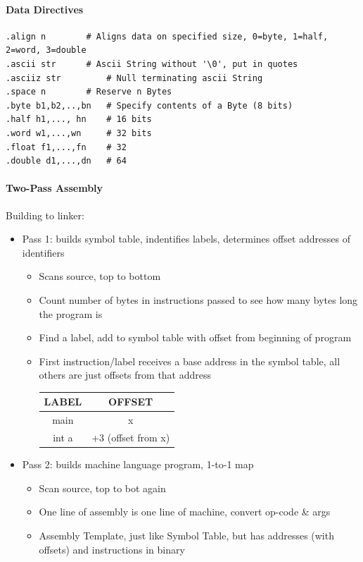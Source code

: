 \documentclass[12 pt]{article}
\begin{document}
\paragraph{Data Directives}
\begin{lstlisting}
.align n		# Aligns data on specified size, 0=byte, 1=half, 2=word, 3=double
.ascii str 	  	# Ascii String without '\0', put in quotes
.asciiz str 	  	# Null terminating ascii String
.space n	  	# Reserve n Bytes
.byte b1,b2,..,bn	# Specify contents of a Byte (8 bits)
.half h1,..., hn  	# 16 bits
.word w1,...,wn		# 32 bits
.float f1,...,fn	# 32
.double d1,...,dn	# 64
\end{lstlisting}
\paragraph{Two-Pass Assembly}
Building to linker:
\begin{itemize}
\item Pass 1: builds symbol table, indentifies labels, determines offset addresses of identifiers
\begin{itemize}
\item Scans source, top to bottom
\item Count number of bytes in instructions passed to see how many bytes long the program is
\item Find a label, add to symbol table with offset from beginning of program
\item First instruction/label receives a base address in the symbol table, all others are just offsets from that address
\\
\begin{tabular}{|c|c|}
LABEL&OFFSET
\\ \hline main & x
\\ int a & +3 (offset from x)
\end{tabular}

\end{itemize}
\item Pass 2: builds machine language program, 1-to-1 map
\begin{itemize}
\item Scan source, top to bot again
\item One line of assembly is one line of machine, convert op-code \& args
\item Assembly Template, just like Symbol Table, but has addresses (with offsets) and instructions in binary
\end{itemize}
\end{itemize}
\end{document}
